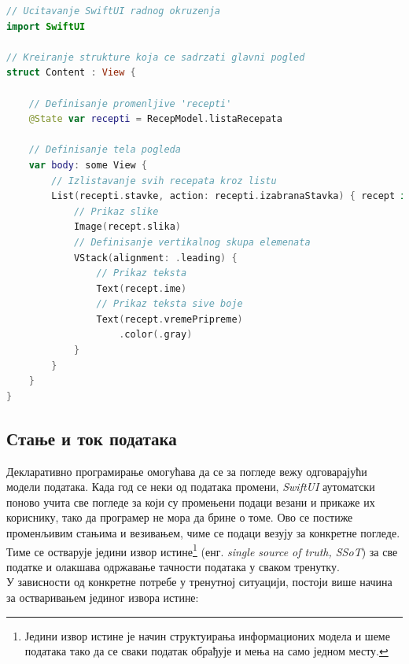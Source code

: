 \documentclass[12pt,oneside]{memoir}
\begin{document}
\begin{lstlisting}[caption=\textit{{Пример SwiftUI кода}}, label={lst:Пример SwiftUI кода}, language=Swift, frame=single]
// Ucitavanje SwiftUI radnog okruzenja
import SwiftUI

// Kreiranje strukture koja ce sadrzati glavni pogled
struct Content : View {

    // Definisanje promenljive 'recepti'
    @State var recepti = RecepModel.listaRecepata
    
    // Definisanje tela pogleda
    var body: some View {
        // Izlistavanje svih recepata kroz listu
        List(recepti.stavke, action: recepti.izabranaStavka) { recept in
            // Prikaz slike
            Image(recept.slika)
            // Definisanje vertikalnog skupa elemenata
            VStack(alignment: .leading) {
                // Prikaz teksta
                Text(recept.ime)
                // Prikaz teksta sive boje
                Text(recept.vremePripreme)
                    .color(.gray)
            }
        }
    } 
}
\end{lstlisting}

\subsection{Стање и ток података}
\label{subsec:Стање и ток података}

\indent Декларативно програмирање омогућава да се за погледе вежу одговарајући модели података. Када год се неки од података промени, \textit{SwiftUI} аутоматски поново учита све погледе за који су промењени подаци везани и прикаже их кориснику, тако да програмер не мора да брине о томе. Ово се постиже променљивим стањима и везивањем, чиме се подаци везују за конкретне погледе. Тиме се остварује једини извор истине\footnote{Једини извор истине је начин структуирања информационих модела и шеме података тако да се сваки податак обрађује и мења на само једном месту.} (енг. \textit{single source of truth, SSoT}) за све податке и олакшава одржавање тачности података у сваком тренутку. 
\\
\indent У зависности од конкретне потребе у тренутној ситуацији, постоји више начина за остваривањем јединог извора истине:
\end{document}
